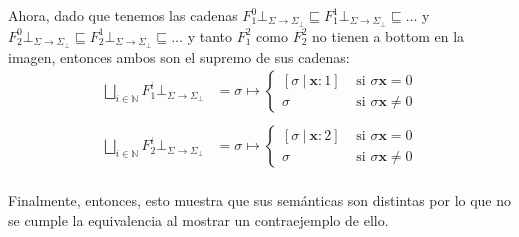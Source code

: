 \documentclass{article}
\newcommand{\N}{\mathbb{N}}
\newcommand{\x}{\textbf{x}}
\newcommand{\supr}{\bigsqcup\limits}
\newcommand{\fleq}{\sqsubseteq}
\newcommand{\cdom}{\Sigma \to \Sigma_\bot}
\newcommand{\cfbot}{\bot_{\cdom}}
\begin{document}
Ahora, dado que tenemos las cadenas $F_1^0 \cfbot \fleq F_1^1 \cfbot \fleq \dots$ y $F_2^0 \cfbot \fleq F_2^1 \cfbot \fleq \dots$ y tanto $F_1^2$ como $F_2^2$ no tienen a bottom en la imagen, entonces ambos son el supremo de sus cadenas:
\begin{equation*}
  \begin{aligned}
    \supr_{i \in \N} F_1^i \cfbot &= \sigma \mapsto \begin{cases}
      [\sigma\ |\ \x : 1] &\text{ si }\sigma\x = 0 \\ 
      \sigma &\text{ si }\sigma\x \neq 0 
    \end{cases} \\ 
    \\ 
    \supr_{i \in \N} F_2^i \cfbot &= \sigma \mapsto \begin{cases}
      [\sigma\ |\ \x : 2] &\text{ si }\sigma\x = 0 \\ 
      \sigma &\text{ si }\sigma\x \neq 0 
    \end{cases} \\ 
  \end{aligned}
\end{equation*}

Finalmente, entonces, esto muestra que sus semánticas son distintas por lo que no se cumple la equivalencia al mostrar un contraejemplo de ello.
\end{document}
